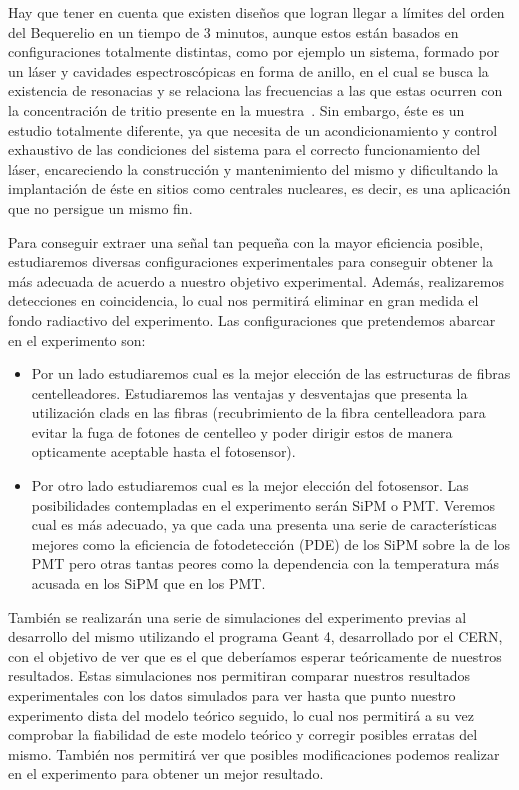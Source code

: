 Hay que tener en cuenta que existen diseños que logran llegar a límites del orden del Bequerelio en un tiempo de 3 minutos, aunque estos están basados en configuraciones totalmente distintas, como por ejemplo un sistema, formado por un láser y cavidades espectroscópicas en forma de anillo, en el cual se  busca la existencia de resonacias y  se relaciona las frecuencias a las que estas ocurren con la concentración de tritio presente en la muestra~\cite{Anillo}. Sin embargo, éste es un estudio totalmente diferente, ya que necesita de un acondicionamiento y control exhaustivo de las condiciones del sistema para el correcto funcionamiento del láser, encareciendo la construcción y mantenimiento del mismo y dificultando la implantación de éste en sitios como centrales nucleares, es decir, es una aplicación que no persigue un mismo fin. 

Para conseguir extraer una señal tan pequeña con la mayor eficiencia posible,  estudiaremos diversas configuraciones experimentales para conseguir obtener la más adecuada de acuerdo a nuestro objetivo experimental. Además, realizaremos detecciones en coincidencia, lo cual nos permitirá eliminar en gran medida el fondo radiactivo del experimento. Las configuraciones que pretendemos abarcar en el experimento son: 
\begin{itemize}
\item {}
Por un lado estudiaremos cual es la mejor elección de las estructuras de fibras centelleadores. Estudiaremos las ventajas y desventajas que presenta la utilización clads en las fibras (recubrimiento de la fibra centelleadora para evitar la fuga de fotones de centelleo y poder dirigir estos de manera opticamente aceptable hasta el fotosensor). 
\item {}
Por otro lado estudiaremos cual es la mejor elección del fotosensor. Las posibilidades contempladas en el experimento serán SiPM o PMT. Veremos cual es más adecuado, ya que cada una presenta una serie de características mejores como la eficiencia de fotodetección (PDE) de los SiPM sobre la de los PMT pero otras tantas peores como la dependencia con la temperatura más acusada en los SiPM que en los PMT.
\end{itemize}

También se realizarán una serie de simulaciones del experimento previas al desarrollo del mismo utilizando el programa Geant 4, desarrollado por el CERN, con el objetivo de ver que es el que deberíamos esperar teóricamente de nuestros resultados. Estas simulaciones nos permitiran comparar nuestros resultados experimentales con los datos simulados para ver hasta que punto nuestro experimento dista del modelo teórico seguido, lo cual nos permitirá a su vez comprobar la fiabilidad de este modelo teórico y corregir posibles erratas del mismo. También nos permitirá ver que posibles modificaciones podemos realizar en el experimento para obtener un mejor resultado.

